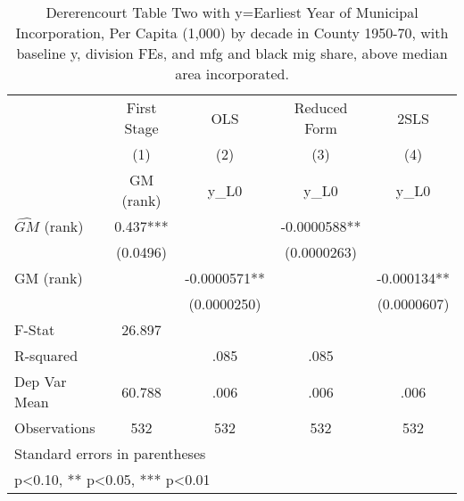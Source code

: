 \begin{table}[htbp]\centering
\def\sym#1{\ifmmode^{#1}\else\(^{#1}\)\fi}
\caption{Dererencourt Table Two with y=Earliest Year of Municipal Incorporation, Per Capita (1,000) by decade in County 1950-70, with baseline y, division FEs, and mfg and black mig share, above median area incorporated.}
\begin{tabular}{l*{4}{c}}
\toprule
                    & First Stage   &         OLS   &Reduced Form   &        2SLS   \\
                    &\multicolumn{1}{c}{(1)}&\multicolumn{1}{c}{(2)}&\multicolumn{1}{c}{(3)}&\multicolumn{1}{c}{(4)}\\
                    &\multicolumn{1}{c}{GM  (rank)}&\multicolumn{1}{c}{y\_L0}&\multicolumn{1}{c}{y\_L0}&\multicolumn{1}{c}{y\_L0}\\
\midrule
$\hat{GM}$ (rank)   &       0.437***&               &  -0.0000588** &               \\
                    &    (0.0496)   &               & (0.0000263)   &               \\
\addlinespace
GM  (rank)          &               &  -0.0000571** &               &   -0.000134** \\
                    &               & (0.0000250)   &               & (0.0000607)   \\
\midrule
F-Stat              &      26.897   &               &               &               \\
R-squared           &               &        .085   &        .085   &               \\
Dep Var Mean        &      60.788   &        .006   &        .006   &        .006   \\
Observations        &         532   &         532   &         532   &         532   \\
\bottomrule
\multicolumn{5}{l}{\footnotesize Standard errors in parentheses}\\
\multicolumn{5}{l}{\footnotesize * p<0.10, ** p<0.05, *** p<0.01}\\
\end{tabular}
\end{table}
